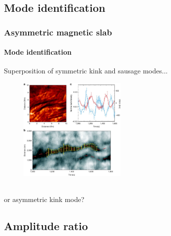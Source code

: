 \documentclass[table]{beamer}
\begin{document}
\subsection{Mode identification}


\begin{frame}
\frametitle{Asymmetric magnetic slab}
\framesubtitle{Mode identification}
\centering
\large
Superposition of symmetric kink and sausage modes...
\begin{figure}
\centering
\includegraphics[height=5cm]{media/mor12.jpg}
\end{figure}
\tiny
{}\\
\normalsize
\centering
\pause
\large
or asymmetric kink mode?
\end{frame}


\subsection{Amplitude ratio}
\end{document}
